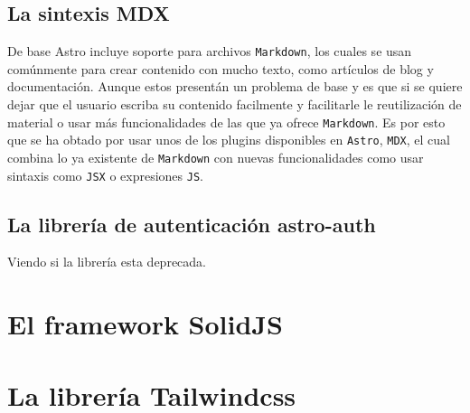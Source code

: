 \subsection{La sintexis MDX}
De base Astro incluye soporte para archivos \verb|Markdown|\cite{md}, los cuales se usan comúnmente para crear contenido con mucho texto, como artículos de blog y documentación. Aunque estos presentán un problema de base y es que si se quiere dejar que el usuario escriba su contenido facilmente y facilitarle le reutilización de material o usar más funcionalidades de las que ya ofrece \verb|Markdown|\cite{md}. Es por esto que se ha obtado por usar unos de los plugins disponibles en \verb|Astro|\cite{astro}, \verb|MDX|\cite{mdx}, el cual combina lo ya existente de \verb|Markdown|\cite{md} con nuevas funcionalidades como usar sintaxis como \verb|JSX|\cite{jsx} o expresiones \verb|JS|\cite{js}.

\subsection{La librería de autenticación astro-auth}
Viendo si la librería esta deprecada.

\section{El framework SolidJS}

\section{La librería Tailwindcss}
